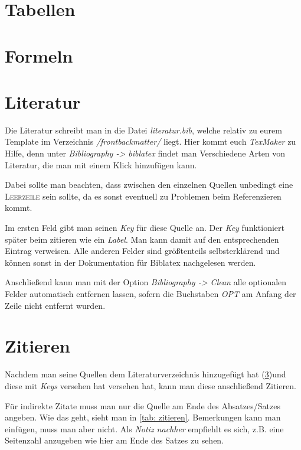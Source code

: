 \section{Tabellen}%
%
%
\section{Formeln}%
%
%
\section{Literatur}%
\label{sec: literatur}%
Die Literatur schreibt man in die Datei \emph{literatur.bib}, welche relativ zu eurem Template im Verzeichnis \emph{/frontbackmatter/} liegt. Hier kommt euch \emph{TexMaker} zu Hilfe, denn unter \emph{Bibliography -> biblatex} findet man Verschiedene Arten von Literatur, die man mit einem Klick hinzufügen kann.%

Dabei sollte man beachten, dass zwischen den einzelnen Quellen unbedingt eine \textsc{Leerzeile} sein sollte, da es sonst eventuell zu Problemen beim Referenzieren kommt.%

Im ersten Feld gibt man seinen \emph{Key} für diese Quelle an. Der \emph{Key} funktioniert später beim zitieren wie ein \emph{Label}. Man kann damit auf den entsprechenden Eintrag verweisen. Alle anderen Felder sind größtenteils selbsterklärend und können sonst in der Dokumentation für Biblatex nachgelesen werden.%

Anschließend kann man mit der Option \emph{Bibliography -> Clean} alle optionalen Felder automatisch entfernen lassen, sofern die Buchstaben \emph{OPT} am Anfang der Zeile nicht entfernt wurden.%
%
%
\section{Zitieren}%
\label{sec: zitieren}
Nachdem man seine Quellen dem Literaturverzeichnis hinzugefügt hat (\ref{sec: literatur})und diese mit \emph{Keys} versehen hat versehen hat, kann man diese anschließend Zitieren.%

Für indirekte Zitate muss man nur die Quelle am Ende des Absatzes/Satzes angeben. Wie das geht, sieht man in \ref{tab: zitieren}. Bemerkungen kann man einfügen, muss man aber nicht. Als \emph{Notiz nachher} empfiehlt es sich, z.B. eine Seitenzahl anzugeben wie hier am Ende des Satzes zu sehen. \cite[][S.22 ff]{einstein}%

